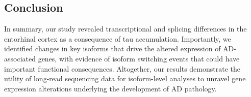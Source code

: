 \subsection{Conclusion}
In summary, our study revealed transcriptional and splicing differences in the entorhinal cortex as a consequence of tau accumulation. Importantly, we identified changes in key isoforms that drive the altered expression of AD-associated genes, with evidence of isoform switching events that could have important functional consequences. Altogether, our results demonstrate the utility of long-read sequencing data for isoform-level analyses to unravel gene expression alterations underlying the development of AD pathology. 